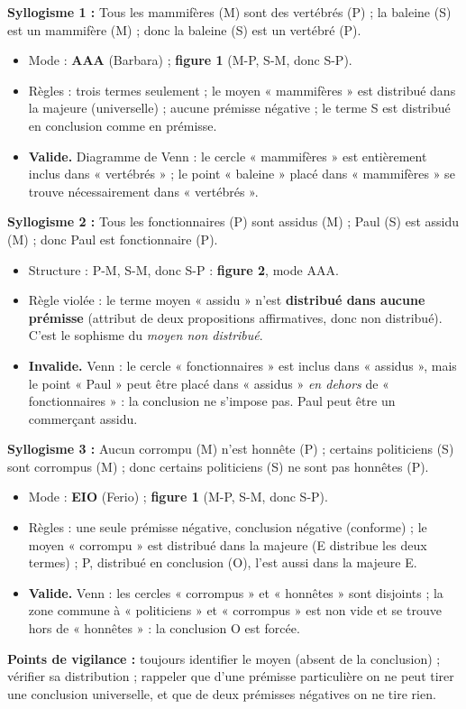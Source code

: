 \documentclass[11pt]{article}
\newcommand{\cle}[1]{{\popxbold\color{popdark}#1}}
\begin{document}
\begin{corrige}
\textbf{Syllogisme 1 :} Tous les mammifères (M) sont des vertébrés (P) ; la baleine (S) est un mammifère (M) ; donc la baleine (S) est un vertébré (P).
\begin{itemize}
    \item Mode : \textbf{AAA} (Barbara) ; \textbf{figure 1} (M-P, S-M, donc S-P).
    \item Règles : trois termes seulement ; le moyen « mammifères » est distribué dans la majeure (universelle) ; aucune prémisse négative ; le terme S est distribué en conclusion comme en prémisse.
    \item \textbf{Valide.} Diagramme de Venn : le cercle « mammifères » est entièrement inclus dans « vertébrés » ; le point « baleine » placé dans « mammifères » se trouve nécessairement dans « vertébrés ».
\end{itemize}

\textbf{Syllogisme 2 :} Tous les fonctionnaires (P) sont assidus (M) ; Paul (S) est assidu (M) ; donc Paul est fonctionnaire (P).
\begin{itemize}
    \item Structure : P-M, S-M, donc S-P : \textbf{figure 2}, mode AAA.
    \item Règle violée : le \cle{terme moyen} « assidu » n'est \textbf{distribué dans aucune prémisse} (attribut de deux propositions affirmatives, donc non distribué). C'est le sophisme du \emph{moyen non distribué}.
    \item \textbf{Invalide.} Venn : le cercle « fonctionnaires » est inclus dans « assidus », mais le point « Paul » peut être placé dans « assidus » \emph{en dehors} de « fonctionnaires » : la conclusion ne s'impose pas. Paul peut être un commerçant assidu.
\end{itemize}

\textbf{Syllogisme 3 :} Aucun corrompu (M) n'est honnête (P) ; certains politiciens (S) sont corrompus (M) ; donc certains politiciens (S) ne sont pas honnêtes (P).
\begin{itemize}
    \item Mode : \textbf{EIO} (Ferio) ; \textbf{figure 1} (M-P, S-M, donc S-P).
    \item Règles : une seule prémisse négative, conclusion négative (conforme) ; le moyen « corrompu » est distribué dans la majeure (E distribue les deux termes) ; P, distribué en conclusion (O), l'est aussi dans la majeure E.
    \item \textbf{Valide.} Venn : les cercles « corrompus » et « honnêtes » sont disjoints ; la zone commune à « politiciens » et « corrompus » est non vide et se trouve hors de « honnêtes » : la conclusion O est forcée.
\end{itemize}
\textbf{Points de vigilance :} toujours identifier le moyen (absent de la conclusion) ; vérifier sa distribution ; rappeler que d'une prémisse particulière on ne peut tirer une conclusion universelle, et que de deux prémisses négatives on ne tire rien.
\end{corrige}
\end{document}
